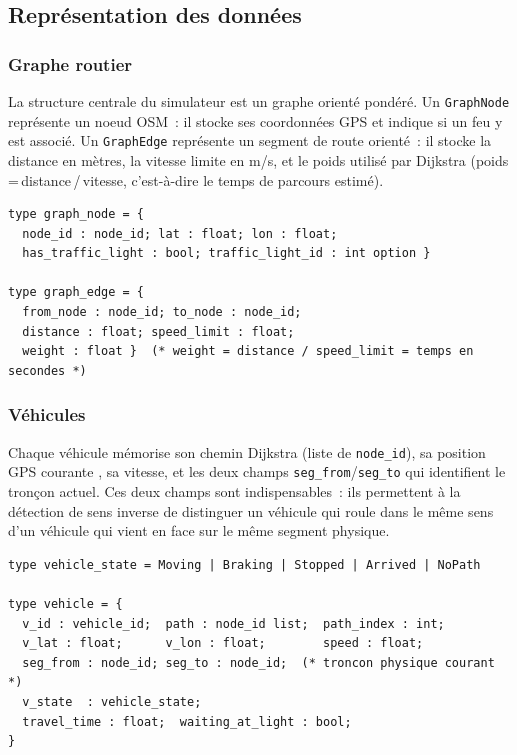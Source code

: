 \documentclass[a4paper,10pt]{article}
\begin{document}
\subsection{Repr\'{e}sentation des donn\'{e}es}

\subsubsection*{Graphe routier}

La structure centrale du simulateur est un graphe orient\'{e} pond\'{e}r\'{e}.
Un \texttt{GraphNode} repr\'{e}sente un noeud OSM~: il stocke ses coordonn\'{e}es
GPS et indique si un feu y est associ\'{e}. Un \texttt{GraphEdge} repr\'{e}sente
un segment de route orient\'{e}~: il stocke la distance en m\`{e}tres,
la vitesse limite en m/s, et le poids utilis\'{e} par Dijkstra
(poids\,=\,distance\,/\,vitesse, c'est-\`{a}-dire le temps de parcours estim\'{e}).

\begin{lstlisting}
type graph_node = {
  node_id : node_id; lat : float; lon : float;
  has_traffic_light : bool; traffic_light_id : int option }

type graph_edge = {
  from_node : node_id; to_node : node_id;
  distance : float; speed_limit : float;
  weight : float }  (* weight = distance / speed_limit = temps en secondes *)
\end{lstlisting}

\subsubsection*{V\'{e}hicules}

Chaque v\'{e}hicule m\'{e}morise son chemin Dijkstra (liste de \texttt{node\_id}),
sa position GPS courante , sa vitesse, et les deux champs
\texttt{seg\_from}/\texttt{seg\_to} qui identifient le tron\c{c}on
actuel. Ces deux champs sont indispensables~: ils permettent \`{a} la d\'{e}tection
de sens inverse de distinguer un v\'{e}hicule qui roule dans le m\^{e}me sens
d'un v\'{e}hicule qui vient en face sur le m\^{e}me segment physique.

\begin{lstlisting}
type vehicle_state = Moving | Braking | Stopped | Arrived | NoPath

type vehicle = {
  v_id : vehicle_id;  path : node_id list;  path_index : int;
  v_lat : float;      v_lon : float;        speed : float;
  seg_from : node_id; seg_to : node_id;  (* troncon physique courant *)
  v_state  : vehicle_state;
  travel_time : float;  waiting_at_light : bool;
}
\end{lstlisting}
\end{document}
